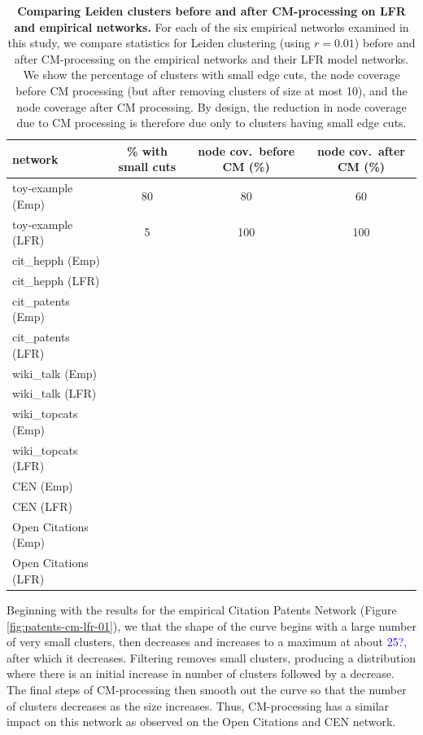 \documentclass[11pt]{article}   	%
\begin{document}
\begin{table}[ht]
\centering
\begin{tabular}{lccc}
  \hline
 network & \% with small cuts & node cov.~before CM (\%) & node cov.~after CM (\%) \\
  \hline
  toy-example (Emp) & 80 & 80 & 60 \\
  toy-example (LFR) & 5 & 100 & 100 \\
  \hline
  cit\_hepph (Emp) &  && \\
  cit\_hepph (LFR) &  && \\
  \hline
  cit\_patents (Emp) & && \\
    cit\_patents  (LFR) & && \\
  \hline
  wiki\_talk (Emp) & && \\
    wiki\_talk (LFR) & && \\
  \hline
  wiki\_topcats  (Emp)& && \\
   wiki\_topcats  (LFR)& && \\
   \hline
   CEN (Emp) &&& \\
   CEN (LFR) &&& \\
   \hline
   Open Citations (Emp) &&& \\
   Open Citations (LFR) &&&\\
   \hline
\end{tabular}
\caption{\textbf{Comparing Leiden clusters before and after CM-processing  on LFR and empirical  networks.} For each of the six empirical networks 
examined in this study, we compare statistics for Leiden clustering (using $r=0.01$) before and after CM-processing on the empirical networks and their LFR model
networks. We show the percentage of clusters with small edge cuts, the node coverage before CM processing (but after removing clusters of size at most 10), and the node coverage
after CM processing.  By design, the reduction in node coverage due to CM processing  is therefore due only to clusters having small edge cuts.}
\label{tab:LFR-vs-empirica-SNAPl}
\end{table}



Beginning with the results for the empirical Citation Patents Network (Figure \ref{fig:patents-cm-lfr-01}), we that the shape of the curve begins with a large number of very small clusters, then decreases and increases to a maximum
at about \textcolor{blue}{25?}, after which it decreases. 
Filtering removes small clusters, producing a distribution where there is an initial increase in number of clusters
followed by a decrease.  The final  steps of CM-processing then smooth out the curve so that the number of clusters decreases as the size increases.
Thus, CM-processing has a similar impact on this network as observed on the Open Citations and CEN network.
\end{document}
